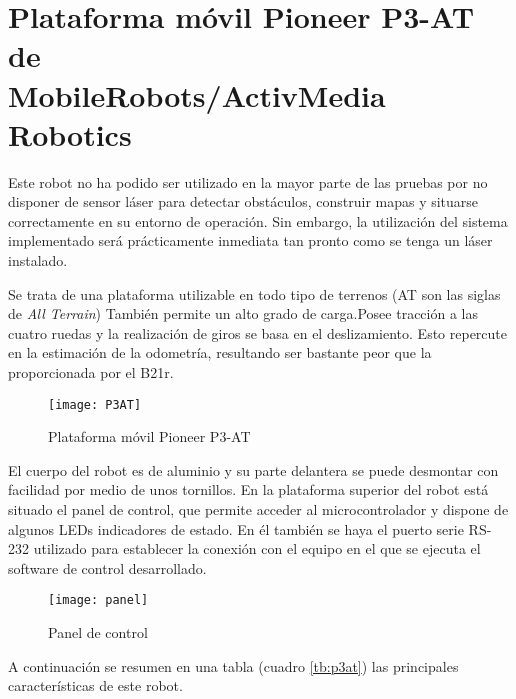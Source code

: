 \section{Plataforma móvil Pioneer P3-AT de \\MobileRobots/ActivMedia Robotics}
Este robot no ha podido ser utilizado en la mayor parte de las pruebas por no disponer de sensor láser para detectar obstáculos, construir mapas y situarse correctamente en su entorno de operación. Sin embargo, la utilización del sistema implementado será prácticamente inmediata tan pronto como se tenga un láser instalado.

Se trata de una plataforma utilizable en todo tipo de terrenos (AT son las siglas de \emph{All Terrain}) También permite un alto grado de carga.Posee tracción a las cuatro ruedas y la realización de giros se basa en el deslizamiento. Esto repercute en la estimación de la odometría, resultando ser bastante peor que la proporcionada por el B21r.

\begin{figure}[h]
  \centering\texttt{[image: P3AT]}\\
  \caption{Plataforma móvil Pioneer P3-AT}\label{fg:P3AT}
\end{figure}

El cuerpo del robot es de aluminio y su parte delantera se puede desmontar con facilidad por medio de unos tornillos. En la plataforma superior del robot está situado el panel de control, que permite acceder al microcontrolador y dispone de algunos LEDs indicadores de estado. En él también se haya el puerto serie RS-232 utilizado para establecer la conexión con el equipo en el que se ejecuta el software de control desarrollado.

\begin{figure}[h]
  \centering\texttt{[image: panel]}\\
  \caption{Panel de control}\label{fg:panel}
\end{figure}

A continuación se resumen en una tabla (cuadro \ref{tb:p3at}) las principales características de este robot.


